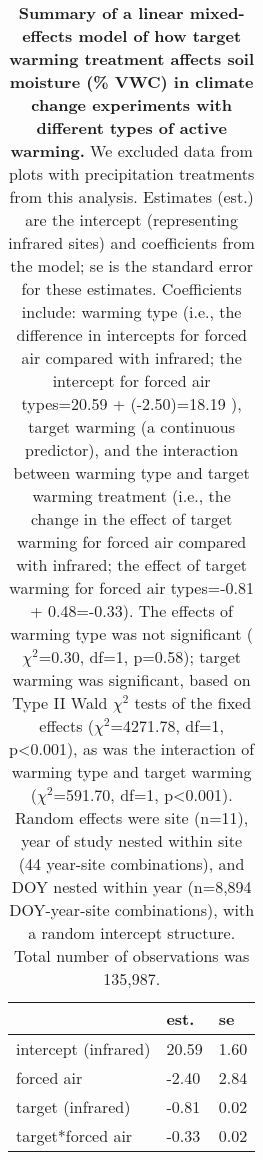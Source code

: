 \documentclass{article}
\begin{document}
\begin{table}[ht]
\centering
\caption{\textbf{Summary of a linear mixed-effects model of how target warming treatment affects soil moisture (\% VWC) in climate change experiments with different types of active warming.} We excluded data from plots with precipitation treatments from this analysis. Estimates (est.) are the intercept (representing infrared sites) and coefficients from the model; se is the standard error for these estimates. Coefficients include: warming type (i.e., the difference in intercepts for forced air compared with infrared; the intercept for forced air types=20.59 + (-2.50)=18.19 ), target warming (a continuous predictor), and the interaction between warming type and target warming treatment (i.e., the change in the effect of target warming for forced air compared with infrared; the effect of target warming for forced air types=-0.81 + 0.48=-0.33). The effects of warming type was not significant ($\chi^{2}$=0.30, df=1, p=0.58); target warming was significant, based on Type II Wald $\chi^{2}$ tests of the fixed effects ($\chi^{2}$=4271.78, df=1, p<0.001), as was the interaction of warming type and target warming ($\chi^{2}$=591.70, df=1, p<0.001). Random effects were site (n=11), year of study nested within site (44 year-site combinations), and DOY nested within year (n=8,894 DOY-year-site combinations), with a random intercept structure. Total number of observations was 135,987.} 
\label{table:targsoilmois}
\begingroup\footnotesize
\begin{tabular}{|p{}|p{}p{}|}
  \hline
 & est. & se \\ 
  \hline
intercept (infrared) & 20.59 & 1.60 \\ 
  forced air & -2.40 & 2.84 \\ 
  target (infrared) & -0.81 & 0.02 \\ 
  target*forced air & -0.33 & 0.02 \\ 
   \hline
\end{tabular}
\endgroup
\end{table}\clearpage
\end{document}
